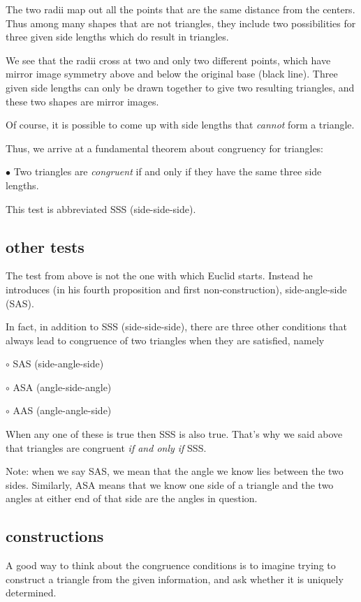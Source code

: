 \documentclass[11pt, oneside]{article}
\begin{document}
The two radii map out all the points that are the same distance from the centers.  Thus among many shapes that are not triangles, they include two possibilities for three given side lengths which do result in triangles.

We see that the radii cross at two and only two different points, which have mirror image symmetry above and below the original base (black line).  Three given side lengths can only be drawn together to give two resulting triangles, and these two shapes are mirror images.

Of course, it is possible to come up with side lengths that \emph{cannot} form a triangle.

Thus, we arrive at a fundamental theorem about congruency for triangles:

$\bullet$  Two triangles are \emph{congruent} if and only if they have the same three side lengths. 

This test is abbreviated SSS (side-side-side).

\subsection*{other tests}

The test from above is not the one with which Euclid starts.  Instead he introduces (in his fourth proposition and first non-construction), side-angle-side (SAS).

In fact, in addition to SSS (side-side-side), there are three other conditions that always lead to congruence of two triangles when they are satisfied, namely

$\circ$  SAS (side-angle-side)

$\circ$  ASA (angle-side-angle)

$\circ$  AAS (angle-angle-side)

When any one of these is true then SSS is also true.  That's why we said above that triangles are congruent \emph{if and only if} SSS.

Note:  when we say SAS, we mean that the angle we know lies between the two sides.  Similarly, ASA means that we know one side of a triangle and the two angles at either end of that side are the angles in question.

\subsection*{constructions}

A good way to think about the congruence conditions is to imagine trying to construct a triangle from the given information, and ask whether it is uniquely determined.  
\end{document}
